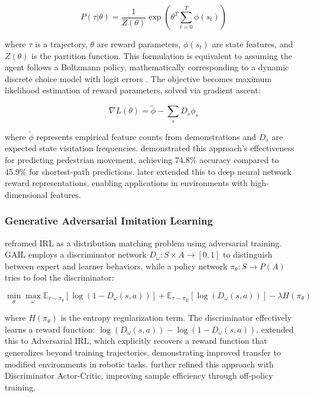 $$P(\tau|\theta) = \frac{1}{Z(\theta)} \exp(\theta^T \sum_{t=0}^T \phi(s_t))$$

\noindent where $\tau$ is a trajectory, $\theta$ are reward parameters, $\phi(s_t)$ are state features, and $Z(\theta)$ is the partition function. This formulation is equivalent to assuming the agent follows a Boltzmann policy, mathematically corresponding to a dynamic discrete choice model with logit errors \citep{Ermon2015}. The objective becomes maximum likelihood estimation of reward parameters, solved via gradient ascent:

$$\nabla L(\theta) = \tilde{\phi} - \sum_s D_s \phi_s$$

\noindent where $\tilde{\phi}$ represents empirical feature counts from demonstrations and $D_s$ are expected state visitation frequencies. \citet{Ziebart2008} demonstrated this approach's effectiveness for predicting pedestrian movement, achieving 74.8\% accuracy compared to 45.9\% for shortest-path predictions. \citet{Wulfmeier2015} later extended this to deep neural network reward representations, enabling applications in environments with high-dimensional features.

\subsubsection{Generative Adversarial Imitation Learning}

\citet{Ho2016} reframed IRL as a distribution matching problem using adversarial training. GAIL employs a discriminator network $D_\omega: S \times A \rightarrow [0,1]$ to distinguish between expert and learner behaviors, while a policy network $\pi_\theta: S \rightarrow P(A)$ tries to fool the discriminator:

$$\min_\theta \max_\omega \mathbb{E}_{\tau \sim \pi_\theta}[\log(1 - D_\omega(s,a))] + \mathbb{E}_{\tau \sim \pi_E}[\log(D_\omega(s,a))] - \lambda H(\pi_\theta)$$

\noindent where $H(\pi_\theta)$ is the entropy regularization term. The discriminator effectively learns a reward function: $\log(D_\omega(s,a)) - \log(1 - D_\omega(s,a))$. \citet{Fu2018} extended this to Adversarial IRL, which explicitly recovers a reward function that generalizes beyond training trajectories, demonstrating improved transfer to modified environments in robotic tasks. \citet{Kostrikov2018} further refined this approach with Discriminator Actor-Critic, improving sample efficiency through off-policy training.

